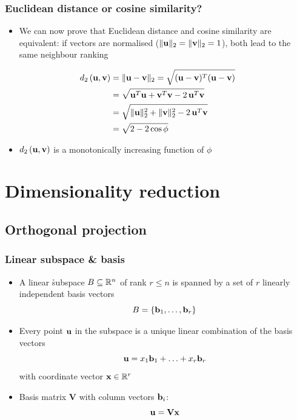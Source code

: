 \documentclass[t]{beamer} %
\begin{document}
\begin{frame}[fragile]
  \frametitle{Euclidean distance or cosine similarity?}

  \begin{itemize}
  \item We can now prove that Euclidean distance and cosine similarity are equivalent: 
    if vectors are normalised ($\norm[2]{\vu} = \norm[2]{\vv} = 1$), both lead to the same neighbour ranking
  \end{itemize}

  \begin{align*}
    \dist[2]{\vu}{\vv} 
    &= \norm[2]{\vu - \vv}
    = \sqrt{(\vu - \vv)^T (\vu - \vv)}
    \\
    &= \sqrt{\vu^T \vu + \vv^T \vv - 2\, \vu^T \vv}
    \\
    &= \sqrt{\norm[2]{\vu}^2 + \norm[2]{\vv}^2 - 2\, \vu^T \vv}
    \\
    &= \sqrt{2 - 2 \cos \phi}
  \end{align*}
  \ungap
  \begin{itemize}
  \item[\hand] $\dist[2]{\vu}{\vv}$ is a monotonically increasing function of $\phi$
  \end{itemize}
\end{frame}


\section{Dimensionality reduction}

\subsection{Orthogonal projection}

\begin{frame}
  \frametitle{Linear subspace \& basis}
  
  \begin{itemize}
  \item A linear \h{subspace} $B\subseteq \mathbb{R}^n$ of rank $r\leq n$ is spanned by a set of $r$ linearly independent basis vectors
    \[
    B = \set{\vb_1, \ldots, \vb_r}
    \]
  \item<2-> Every point $\vu$ in the subspace is a unique linear combination of the basis vectors
    \[
    \vu = x_1 \vb_1 + \ldots + x_r \vb_r
    \]
    with coordinate vector $\vx\in \setR^r$
  \item<3-> Basis matrix $\mathbf{V}$ with column vectors $\vb_i$:
    \[
    \vu = \mathbf{V} \vx
    \]
  \end{itemize}
\end{frame}
\end{document}

